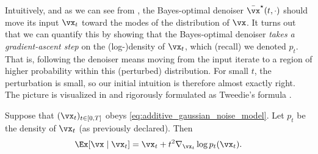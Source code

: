 \documentclass[../../book-main.tex]{subfiles}
\begin{document}
Intuitively, and as we can see from
, the Bayes-optimal denoiser
\(\bar{\vx}^{\star}(t, \cdot)\) should move its input \(\vx_{t}\)
toward the modes of the distribution of \(\vx\). It turns out that we
can quantify this by showing that the Bayes-optimal denoiser
\textit{takes a gradient-ascent step} on the (log-)density
of \(\vx_{t}\), which (recall) we denoted \(p_{t}\). That is,
following the denoiser means moving from the input iterate to a
region of higher probability within this (perturbed) distribution.
For small \(t\), the perturbation is small, so our initial intuition
is therefore almost exactly right. The picture is visualized in
 and rigorously formulated as
Tweedie's formula \cite{Robbins1956AnEB}.
\begin{theorem}\label{thm:tweedie}
    Suppose that \((\vx_{t})_{t \in [0, T]}\) obeys
    \eqref{eq:additive_gaussian_noise_model}. Let \(p_{t}\) be the
    density of \(\vx_{t}\) (as previously declared). Then
    \begin{equation}\label{eq:tweedie}
        \Ex[\vx \mid \vx_{t}] = \vx_{t} + t^{2}\nabla_{\vx_{t}} \log
        p_{t}(\vx_{t}).
    \end{equation}
\end{theorem}
\end{document}
